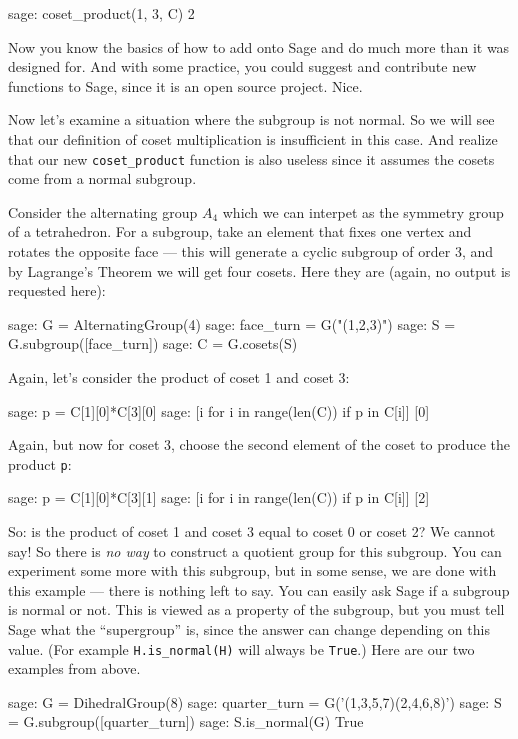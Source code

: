 %
\begin{sageexample}
sage: coset_product(1, 3, C)
2
\end{sageexample}
%
Now you know the basics of how to add onto Sage and do much more than it was designed for.  And with some practice, you could suggest and contribute new functions to Sage, since it is an open source project.  Nice.\par
%
Now let's examine a situation where the subgroup is not normal.  So we will see that our definition of coset multiplication is insufficient in this case.  And realize that our new \verb?coset_product? function is also useless since it assumes the cosets come from a normal subgroup.\par
%
Consider the alternating group $A_4$ which we can interpet as the symmetry group of a tetrahedron.  For a subgroup, take an element that fixes one vertex and rotates the opposite face --- this will generate a cyclic subgroup of order 3, and by Lagrange's Theorem we will get four cosets.  Here they are (again, no output is requested here):
%
\begin{sageexample}
sage: G = AlternatingGroup(4)
sage: face_turn = G("(1,2,3)")
sage: S = G.subgroup([face_turn])
sage: C = G.cosets(S)
\end{sageexample}
%
Again, let's consider the product of coset 1 and coset 3:
%
\begin{sageexample}
sage: p = C[1][0]*C[3][0]
sage: [i for i in range(len(C)) if p in C[i]]
[0]
\end{sageexample}
%
Again, but now for coset 3, choose the second element of the coset to produce the product \verb?p?:
%
\begin{sageexample}
sage: p = C[1][0]*C[3][1]
sage: [i for i in range(len(C)) if p in C[i]]
[2]
\end{sageexample}
%
So: is the product of coset 1 and coset 3 equal to coset 0 or coset 2?  We cannot say!  So there is \emph{no way} to construct a quotient group for this subgroup.  You can experiment some more with this subgroup, but in some sense, we are done with this example --- there is nothing left to say.
%
%
You can easily ask Sage if a subgroup is normal or not.  This is viewed as a property of the subgroup, but you must tell Sage what the ``supergroup'' is, since the answer can change depending on this value.  (For example \verb?H.is_normal(H)? will always be \verb?True?.)  Here are our two examples from above.
%
\begin{sageexample}
sage: G = DihedralGroup(8)
sage: quarter_turn = G('(1,3,5,7)(2,4,6,8)')
sage: S = G.subgroup([quarter_turn])
sage: S.is_normal(G)
True
\end{sageexample}
